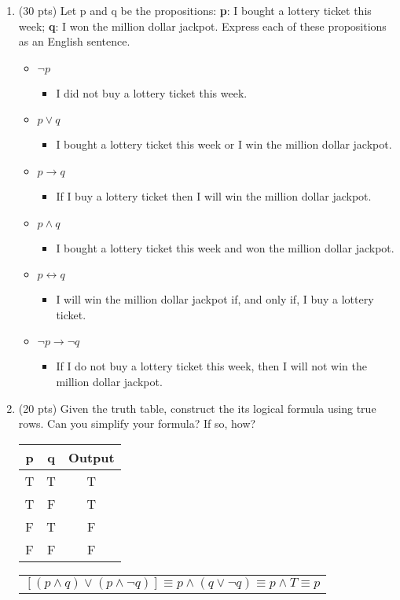 \documentclass[11pt]{article}
\begin{document}
\begin{enumerate}
    \item (30 pts) Let p and q be the propositions: \textbf{p}: I bought a lottery ticket this week; \textbf{q}: I won the million dollar jackpot. Express each of these propositions as an English sentence.
    \begin{itemize}
    	\item $\neg p$
	\begin{itemize}
	  \item I did not buy a lottery ticket this week.
	  \end{itemize}
    	\item $p \vee q$
	\begin{itemize}
	  \item I bought a lottery ticket this week or I win the million dollar jackpot.
	  \end{itemize}
    	\item $p \rightarrow q$
	\begin{itemize}
	  \item If I buy a lottery ticket then I will win the million dollar jackpot.
	  \end{itemize}
    	\item $p \wedge q$
	\begin{itemize}
	  \item I bought a lottery ticket this week and won the million dollar jackpot.
	  \end{itemize}
    	\item $p \leftrightarrow q$
	\begin{itemize}
	  \item I will win the million dollar jackpot if, and only if, I buy a lottery ticket.
	  \end{itemize}
    	\item $\neg p \rightarrow \neg q$
	\begin{itemize}
	  \item If I do not buy a lottery ticket this week, then I will not win the million dollar jackpot.
	  \end{itemize}
    \end{itemize}
    \item (20 pts) Given the truth table, construct the its logical formula using true rows. Can you simplify your formula? If so, how?\\
    
    \begin{tabular}{ |c| c| c| }
      \hline
      p & q & Output\\
      \hline
      T&T&T\\  \hline
      T&F&T\\  \hline
      F&T&F\\  \hline
      F&F&F\\  \hline 
      \end{tabular}
      
    \vspace{0.1in}
    \begin{tabular}{r}
      $[(p \wedge q) \vee (p \wedge \neg q)] \equiv p \wedge (q \vee \neg q) \equiv p \wedge T \equiv p$\\
      \end{tabular}
  \end{enumerate}
\end{document}
